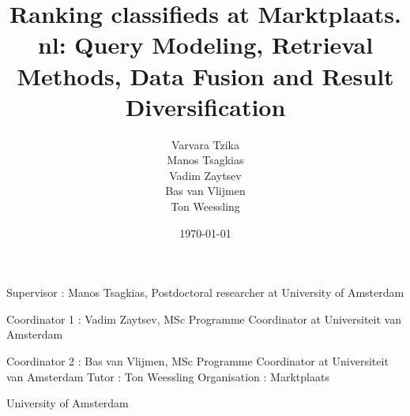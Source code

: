 \documentclass[a4paper, 12pt]{report}
\title{Ranking classifieds at Marktplaats. nl: Query Modeling, Retrieval Methods, Data Fusion and Result Diversification}
\author{Varvara Tzika \\
	Manos Tsagkias \\
	Vadim Zaytsev \\
	Bas van Vlijmen \\
	Ton Weessling}
\date{\today}
\begin{document}
\maketitle

Supervisor : Manos Tsagkias, \bigskip
Postdoctoral researcher at University of Amsterdam \bigskip

Coordinator 1 : Vadim Zaytsev, \bigskip
MSc Programme Coordinator at Universiteit van Amsterdam

Coordinator 2 : Bas van Vlijmen, \bigskip
MSc Programme Coordinator at Universiteit van Amsterdam
\bigskip
Tutor : Ton Weessling \bigskip
Organisation : Marktplaats \bigskip

University of Amsterdam



















\end{document}
